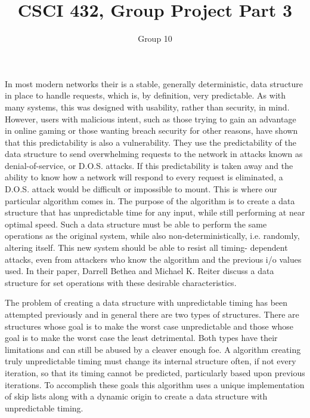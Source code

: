 \documentclass[11pt]{article}
\title{CSCI 432, Group Project Part 3}
\author{Group 10}
\begin{document}
\maketitle


	In most modern networks their is a stable, generally deterministic, data
structure in place to handle requests, which is, by definition, very predictable. As with many systems, this was designed with usability, rather than security, in mind. However, users with malicious intent, such as those trying to gain an advantage in online gaming or those wanting breach security for other reasons, have shown that this predictability is also a vulnerability. They use the predictability of the data structure to send overwhelming requests to the network in attacks known as denial-of-service, or D.O.S. attacks. If this predictability is taken away and the ability to know how a network will respond to every request is eliminated, a D.O.S. attack would be difficult or impossible to mount. This is where our particular algorithm comes in. The purpose of the algorithm is to create a data structure that has unpredictable time for any input, while still performing at near optimal speed. Such a data structure must be able to perform the same operations as 
the original system, while also non-deterministically, i.e. randomly, 
altering itself. This new system should be able to resist all timing-
dependent attacks,
even from attackers who know the algorithm and the previous i/o values used.
In their paper, Darrell Bethea and Michael K. Reiter discuss a data
structure for set operations with these desirable characteristics\cite{Bethea09}.


	The problem of creating a data structure with unpredictable timing has been 
attempted previously and in general there are two types of structures.
There are structures whose goal is to make the worst case unpredictable and 
those whose goal is to make the worst case the least detrimental. Both types 
have their limitations and can still be abused by a cleaver enough foe.
A algorithm creating truly unpredictable timing must change its internal 
structure often, if not every iteration, so that its timing cannot be predicted, particularly based upon previous iterations. 
To accomplish these goals this algorithm uses a unique implementation of skip 
lists along with a dynamic origin to create a data structure with unpredictable timing.
\end{document}
